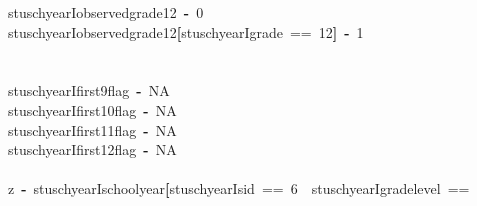 \documentclass[12pt]{article}
\makeatletter
\newcommand{\hlnumber}[1]{\textcolor[rgb]{0,0,0}{#1}}%
\newcommand{\hlkeyword}[1]{\textcolor[rgb]{0,0,0}{\textbf{#1}}}%
\newcommand{\hlassignement}[1]{\textcolor[rgb]{0,0,0}{\textbf{#1}}}%
\newcommand{\hlsymbol}[1]{\textcolor[rgb]{0,0,0}{#1}}%
\newcommand{\hlstd}[1]{\textcolor[rgb]{0,0,0}{#1}}%
\newenvironment{kframe}{%
 \def\FrameCommand##1{\hskip\@totalleftmargin \hskip-\fboxsep
 \colorbox{shadecolor}{##1}\hskip-\fboxsep
     \hskip-\linewidth \hskip-\@totalleftmargin \hskip\columnwidth}%
 \MakeFramed {\advance\hsize-\width
   \@totalleftmargin\z@ \linewidth\hsize
   \@setminipage}}%
 {\par\unskip\endMakeFramed}
\newenvironment{knitrout}{}{} %
\renewenvironment{knitrout}{\begin{footnotesize}}{\end{footnotesize}}
\makeatother
\begin{document}
\begin{knitrout}
\begin{kframe}
\begin{flushleft}
\hlstd{}\hlsymbol{stuschyearI}\hlkeyword{\usebox{\hlnormalsizeboxdollar}}\hlsymbol{observed\usebox{\hlnormalsizeboxunderscore}grade\usebox{\hlnormalsizeboxunderscore}12}{\ }\hlassignement{\usebox{\hlnormalsizeboxlessthan}-}{\ }\hlnumber{0}\hspace*{\fill}\\
\hlstd{}\hlsymbol{stuschyearI}\hlkeyword{\usebox{\hlnormalsizeboxdollar}}\hlsymbol{observed\usebox{\hlnormalsizeboxunderscore}grade\usebox{\hlnormalsizeboxunderscore}12}\hlkeyword{[}\hlsymbol{stuschyearI}\hlkeyword{\usebox{\hlnormalsizeboxdollar}}\hlsymbol{grade}{\ }=={\ }\hlnumber{12}\hlkeyword{]}{\ }\hlassignement{\usebox{\hlnormalsizeboxlessthan}-}{\ }\hlnumber{1}\hspace*{\fill}\\
\hlstd{}\hspace*{\fill}\\
\hlstd{}\hspace*{\fill}\\
\hlstd{}\hlsymbol{stuschyearI}\hlkeyword{\usebox{\hlnormalsizeboxdollar}}\hlsymbol{first9\usebox{\hlnormalsizeboxunderscore}flag}{\ }\hlassignement{\usebox{\hlnormalsizeboxlessthan}-}{\ }\hlnumber{NA}\hspace*{\fill}\\
\hlstd{}\hlsymbol{stuschyearI}\hlkeyword{\usebox{\hlnormalsizeboxdollar}}\hlsymbol{first10\usebox{\hlnormalsizeboxunderscore}flag}{\ }\hlassignement{\usebox{\hlnormalsizeboxlessthan}-}{\ }\hlnumber{NA}\hspace*{\fill}\\
\hlstd{}\hlsymbol{stuschyearI}\hlkeyword{\usebox{\hlnormalsizeboxdollar}}\hlsymbol{first11\usebox{\hlnormalsizeboxunderscore}flag}{\ }\hlassignement{\usebox{\hlnormalsizeboxlessthan}-}{\ }\hlnumber{NA}\hspace*{\fill}\\
\hlstd{}\hlsymbol{stuschyearI}\hlkeyword{\usebox{\hlnormalsizeboxdollar}}\hlsymbol{first12\usebox{\hlnormalsizeboxunderscore}flag}{\ }\hlassignement{\usebox{\hlnormalsizeboxlessthan}-}{\ }\hlnumber{NA}\hspace*{\fill}\\
\hlstd{}\hspace*{\fill}\\
\hlstd{}\hlsymbol{z}{\ }\hlassignement{\usebox{\hlnormalsizeboxlessthan}-}{\ }\hlsymbol{stuschyearI}\hlkeyword{\usebox{\hlnormalsizeboxdollar}}\hlsymbol{school\usebox{\hlnormalsizeboxunderscore}year}\hlkeyword{[}\hlsymbol{stuschyearI}\hlkeyword{\usebox{\hlnormalsizeboxdollar}}\hlsymbol{sid}{\ }=={\ }\hlnumber{6}{\ }\hlkeyword{\usebox{\hlnormalsizeboxand}}{\ }\hlsymbol{stuschyearI}\hlkeyword{\usebox{\hlnormalsizeboxdollar}}\hlsymbol{grade\usebox{\hlnormalsizeboxunderscore}level}{\ }==\hspace*{\fill}\\

\end{flushleft}
\end{kframe}
\end{knitrout}
\end{document}
